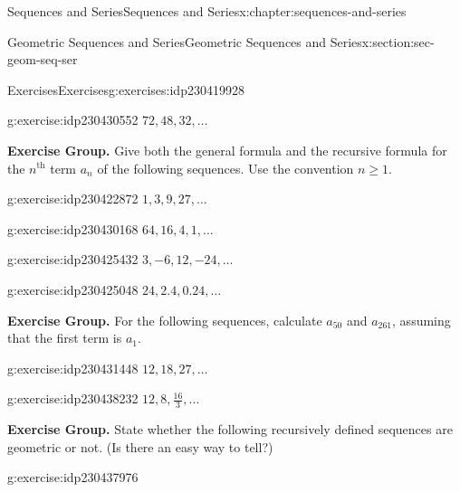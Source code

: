 \documentclass[twoside,10pt,]{book}
\numberwithin{equation}{section}
\newcommand{\nth}{{n^{\text{th}}}}
\begin{document}
\begin{chapterptx}{Sequences and Series}{}{Sequences and Series}{}{}{x:chapter:sequences-and-series}
\begin{sectionptx}{Geometric Sequences and Series}{}{Geometric Sequences and Series}{}{}{x:section:sec-geom-seq-ser}
\begin{exercises-subsection}{Exercises}{}{Exercises}{}{}{g:exercises:idp230419928}
\begin{exercisegroup}
\begin{divisionexerciseeg}{6}{}{}{g:exercise:idp230430552}%
\(72, 48, 32,\ldots\)\end{divisionexerciseeg}%
\end{exercisegroup}
\par\medskip\noindent
\par\medskip\noindent%
\textbf{Exercise Group.}\space\space%
Give both the general formula and the recursive formula for the \(\nth{}\) term \(a_n\) of the following sequences.  Use the convention \(n \ge 1\).\begin{exercisegroup}
\begin{divisionexerciseeg}{7}{}{}{g:exercise:idp230422872}%
\(1, 3, 9, 27, \ldots\)\end{divisionexerciseeg}%
\begin{divisionexerciseeg}{8}{}{}{g:exercise:idp230430168}%
\(64, 16, 4, 1, \ldots\)\end{divisionexerciseeg}%
\begin{divisionexerciseeg}{9}{}{}{g:exercise:idp230425432}%
\(3, -6, 12, -24, \ldots\)\end{divisionexerciseeg}%
\begin{divisionexerciseeg}{10}{}{}{g:exercise:idp230425048}%
\(24, 2.4, 0.24, \ldots\)\end{divisionexerciseeg}%
\end{exercisegroup}
\par\medskip\noindent
\par\medskip\noindent%
\textbf{Exercise Group.}\space\space%
For the following sequences, calculate \(a_{50}\) and \(a_{261}\), assuming that the first term is \(a_1\).\begin{exercisegroup}
\begin{divisionexerciseeg}{11}{}{}{g:exercise:idp230431448}%
\(12, 18, 27,\ldots\)\end{divisionexerciseeg}%
\begin{divisionexerciseeg}{12}{}{}{g:exercise:idp230438232}%
\(12, 8, \frac{{16}}{3}, \ldots\)\end{divisionexerciseeg}%
\end{exercisegroup}
\par\medskip\noindent
\par\medskip\noindent%
\textbf{Exercise Group.}\space\space%
State whether the following recursively defined sequences are geometric or not.  (Is there an easy way to tell?)\begin{exercisegroup}
\begin{divisionexerciseeg}{13}{}{}{g:exercise:idp230437976}%

\end{divisionexerciseeg}
\end{exercisegroup}
\end{exercises-subsection}
\end{sectionptx}
\end{chapterptx}
\end{document}
